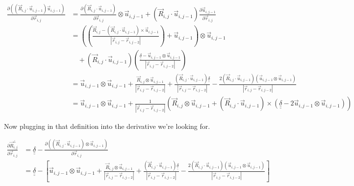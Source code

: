 \documentclass{article}
\renewcommand{\ij}{_{i,j}}
\newcommand{\ijj}{_{i,j-1}}
\newcommand{\ijjj}{_{i,j-2}}
\newcommand{\magn}[1]{\left\vert #1 \right\vert }
\renewcommand{\part}[2]{\frac{\partial #1 }{\partial #2}}
\newcommand{\ten}[1]{\underline{\underline{#1}}}
\newcommand{\rij}{\vec{r} \ij}
\newcommand{\Rij}{\vec{R} \ij}
\newcommand{\rijjj}{\vec{r} \ijjj}
\newcommand{\uijj}{\vec{u} \ijj}
\begin{document}
\begin{align*}
  \part{\left(\left(\vec{R}\ij \cdot \vec{u} \ijj \right) 
  \vec{u} \ijj \right)
  }{\vec{r}\ij} 
  &= 
  \part{\left(\vec{R}\ij \cdot \vec{u} \ijj \right)}{\vec{r}\ij}  
  \otimes
  \vec{u} \ijj  + 
  \left(\vec{R}\ij \cdot \vec{u} \ijj \right)
  \part{\vec{u} \ijj }{\vec{r}\ij}
   \\
  &= 
  \left(
  \left(
  {
  \frac{\Rij - (\Rij \cdot \uijj ) \times \uijj}{\magn{\rij - \rijjj}}
  }
  \right)
  + 
  \vec{u} \ijj 
  \right) 
  \otimes \uijj
  \\
  &
   \quad 
  +  
  \left(\vec{R}\ij \cdot \vec{u} \ijj \right)
  \left(
  {
  \frac{\ten{\delta} - \uijj \otimes \uijj}{\magn{\rij - \rijjj}}
  }
  \right)
  \\
  &=
  \uijj \otimes \uijj
  + 
  \frac{\Rij \otimes \uijj}{\magn{\rij - \rijjj}} 
  +
  \frac{
    \left( 
      \Rij \cdot \uijj   
    \right)
    \ten{\delta}
    }{\magn{\rij - \rijjj}}
  -
  \frac{
    2 \left(
      \Rij \cdot \uijj 
    \right)
    \left(\uijj \otimes \uijj 
    \right)
    }{\magn{\rij - \rijjj}}
    \\
    & = 
    \uijj \otimes \uijj
     + 
     \frac{1}{\magn{\rij - \rijjj}} 
     \left(
      \Rij \otimes \uijj + 
      \left(\Rij \cdot \uijj \right)
      \times (\ten{\delta} - 2 \uijj \otimes \uijj)
     \right)
\end{align*}

Now plugging in that definition into the derivative we're looking for.

\begin{align*}
  \part{\vec{R}\ij ^ \bot}{\vec{r}\ij}  &=  \ten{\delta} 
  - \part{\left(\left(\vec{R}\ij \cdot \vec{u} \ijj \right) \otimes 
  \vec{u} \ijj \right)
  }{\vec{r}\ij} \\
  &= 
  \boxed{
  \ten{\delta} 
  -
  \left[
  \uijj \otimes \uijj
  + 
  \frac{\Rij \otimes \uijj }{\magn{\rij - \rijjj}} 
  +
  \frac{ \left( 
    \Rij \cdot \uijj
    \right) \ten{\delta}}{\magn{\rij - \rijjj}}
  -
  \frac{
    2 \left(
      \Rij \cdot \uijj 
    \right)
    \left(\uijj \otimes \uijj 
    \right)
    }{\magn{\rij - \rijjj}}
  \right]
  }
\end{align*}
 
\end{document}

